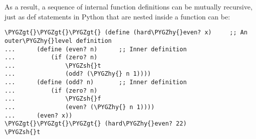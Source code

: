 \documentclass[letterpaper,10pt,dvipdfmx]{sphinxmanual}
\def\PYGZgt{\char`\>}
\def\PYGZsh{\char`\#}
\def\PYGZhy{\char`\-}
\begin{document}
As a result, a sequence of internal function definitions can be mutually recursive, just as def statements in Python that are nested inside a function can be:

\begin{Verbatim}[commandchars=\\\{\}]
\PYGZgt{}\PYGZgt{}\PYGZgt{} (define (hard\PYGZhy{}even? x)     ;; An outer\PYGZhy{}level definition
...      (define (even? n)      ;; Inner definition
...          (if (zero? n)
...              \PYGZsh{}t
...              (odd? (\PYGZhy{} n 1))))
...      (define (odd? n)       ;; Inner definition
...          (if (zero? n)
...              \PYGZsh{}f
...              (even? (\PYGZhy{} n 1))))
...      (even? x))
\PYGZgt{}\PYGZgt{}\PYGZgt{} (hard\PYGZhy{}even? 22)
\PYGZsh{}t
\end{Verbatim}
\end{document}
